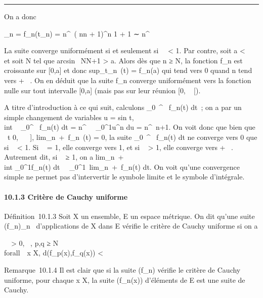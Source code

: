 \documentclass[]{article}
\begin{document}
\begin{center}\rule{3in}{0.4pt}\end{center}

On a donc

\mu\_n = f\_n(t\_n) =
n^\alpha~\left ( n\over n +
1\right )^n 1\over
\sqrtn + 1 ∼ n^\alpha~\over
\sqrte\sqrtn

La suite converge uniformément si et seulement si~\alpha~ \textless{}
1. Par contre, soit a \textless{}
\pi~ et soit N tel que
arcsin~ \sqrt
N\over N+1 \textgreater{} a. Alors dès que n ≥ N,
la fonction f\_n est croissante sur {[}0,a{]} et donc
sup\_t\leqaf\_n~(t) =
f\_n(a) qui tend vers 0 quand n tend vers + \infty~. On en déduit que
la suite f\_n converge uniformément vers la fonction nulle sur
tout intervalle {[}0,a{]} (mais pas sur leur réunion {[}0,
\pi~ {[}).

A titre d'introduction à ce qui suit, calculons
\int  \_0~^\pi~ f\_n(t) dt~; on a par un simple changement de variables u
= sin t, \\int ~
\_0^\pi~ f\_n(t) dt =
n^\alpha~\int ~
\_0^1u^n du =
n^\alpha~\over n+1. On voit donc que bien que
\forall~t \in {[}0, \pi~~ {]},
lim\_n\rightarrow~+\infty~f\_n~(t) = 0, la suite
\int  \_0~^\pi~ f\_n(t) dt ne converge vers 0 que si \alpha~ \textless{} 1. Si \alpha~
= 1, elle converge vers 1, et si \alpha~ \textgreater{} 1, elle converge vers
+ \infty~. Autrement dit, si \alpha~ ≥ 1, on a
lim\_n\rightarrow~+\infty~~\\int
 \_0^1f\_n(t)
dt\neq~\int ~
\_0^1\
lim\_n\rightarrow~+\infty~f\_n(t) dt. On voit qu'une convergence simple
ne permet pas d'intervertir le symbole limite et le symbole d'intégrale.

\paragraph{10.1.3 Critère de Cauchy uniforme}

Définition~10.1.3 Soit X un ensemble, E un espace métrique. On dit
qu'une suite (f\_n)\_n\in\mathbb{N}~ d'applications de X dans E
vérifie le critère de Cauchy uniforme si on a

\forall~~\epsilon \textgreater{} 0,
\existsN \in {}~, p,q ≥ N \rigtharrow~\\forall~~x
\in X, d(f\_p(x),f\_q(x)) \textless{} \epsilon

Remarque~10.1.4 Il est clair que si la suite (f\_n) vérifie le
critère de Cauchy uniforme, pour chaque x \in X, la suite
(f\_n(x)) d'éléments de E est une suite de Cauchy.
\end{document}
